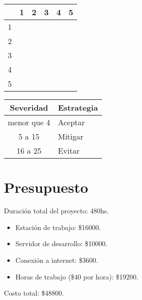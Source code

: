 \begin{center}
\renewcommand{\arraystretch}{1.2}
\begin{tabular}{|c||c|c|c|c|c|}

	\hline
	& 1 & 2 & 3 & 4 & 5 \\ \hline
	\hline
	1 & \cellcolor[gray]{0.8} & \cellcolor[gray]{0.8} & \cellcolor[gray]{0.8} & \cellcolor[gray]{0.8} & \cellcolor[gray]{0.6} \\ \hline
	2 & \cellcolor[gray]{0.8} & \cellcolor[gray]{0.8} & \cellcolor[gray]{0.6} & \cellcolor[gray]{0.6} & \cellcolor[gray]{0.6} \\ \hline
	3 & \cellcolor[gray]{0.8} & \cellcolor[gray]{0.6} & \cellcolor[gray]{0.6} & \cellcolor[gray]{0.6} & \cellcolor[gray]{0.4} \\ \hline
	4 & \cellcolor[gray]{0.8} & \cellcolor[gray]{0.6} & \cellcolor[gray]{0.6} & \cellcolor[gray]{0.4} & \cellcolor[gray]{0.4} \\ \hline
	5 & \cellcolor[gray]{0.6} & \cellcolor[gray]{0.6} & \cellcolor[gray]{0.4} & \cellcolor[gray]{0.4} & \cellcolor[gray]{0.4} \\ \hline
\end{tabular}
\qquad \qquad
\begin{tabular}{|c|l|}
	\hline Severidad & Estrategia \\ \hline
	menor que 4 & Aceptar \\ \hline
	5 a 15 & Mitigar \\ \hline
	16 a 25 & Evitar \\ \hline
	
\end{tabular}
\end{center}

\section*{Presupuesto}

Duración total del proyecto: 480hs.

\begin{itemize}
\item Estación de trabajo: \$16000.
\item Servidor de desarrollo: \$10000.
\item Conexión a internet: \$3600.
\item Horas de trabajo (\$40 por hora): \$19200.
\end{itemize}

Costo total: \$48800.

